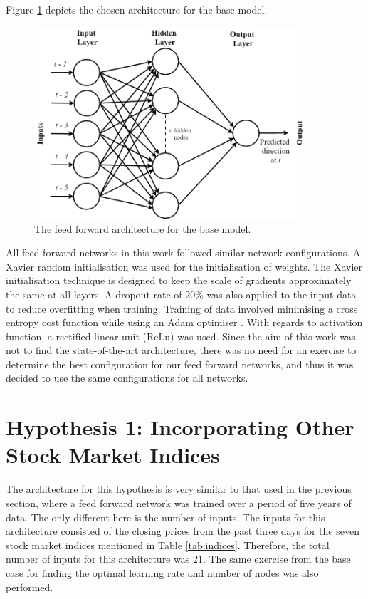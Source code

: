 \documentclass{UoYCSproject}
\begin{document}
Figure \ref{fig:basecase} depicts the chosen architecture for the base model. 

\begin{figure}[h]
\includegraphics[width=10cm]{Base_case_diagram.png}
\centering
\caption{The feed forward architecture for the base model.} 
\label{fig:basecase}
\end{figure}

All feed forward networks in this work followed similar network configurations. A Xavier \cite{glorot2010understanding} random initialisation was used for the initialisation of weights. The Xavier initialisation technique is designed to keep the scale of gradients approximately the same at all layers. A dropout rate of $20$\% was also applied to the input data to reduce overfitting when training. Training of data involved minimising a cross entropy cost function while using an Adam optimiser \cite{kingma2014adam}. With regards to activation function, a rectified linear unit (ReLu) was used. Since the aim of this work was not to find the state-of-the-art architecture, there was no need for an exercise to determine the best configuration for our feed forward networks, and thus it was decided to use the same configurations for all networks. 

\section{Hypothesis 1: Incorporating Other Stock Market Indices}
\label{sec:methodh1}
The architecture for this hypothesis is very similar to that used in the previous section, where a feed forward network was trained over a period of five years of data. The only different here is the number of inputs. The inputs for this architecture consisted of the closing prices from the past three days for the seven stock market indices mentioned in Table \ref{tab:indices}. Therefore, the total number of inputs for this architecture was $21$. The same exercise from the base case for finding the optimal learning rate and number of nodes was also performed. 
\end{document}
